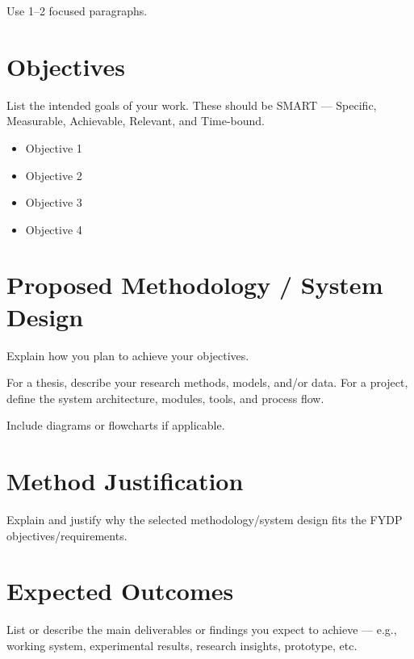 \documentclass[12pt,a4paper]{article}
\begin{document}
\vspace{0.1in}

Use 1--2 focused paragraphs.


\section{Objectives}

List the intended goals of your work. These should be SMART --- Specific,
Measurable, Achievable, Relevant, and Time-bound.

\begin{itemize}[leftmargin=0.35in]
    \item Objective 1
    \item Objective 2
    \item Objective 3
    \item Objective 4
\end{itemize}


\section{Proposed Methodology / System Design}

Explain how you plan to achieve your objectives.

For a thesis, describe your research methods, models, and/or data.
For a project, define the system architecture, modules, tools, and
process flow.

\vspace{0.1in}

Include diagrams or flowcharts if applicable.


\section{Method Justification}

Explain and justify why the selected methodology/system design fits the
FYDP objectives/requirements.


\section{Expected Outcomes}

List or describe the main deliverables or findings you expect to achieve ---
e.g., working system, experimental results, research insights, prototype,
etc.


\end{document}
